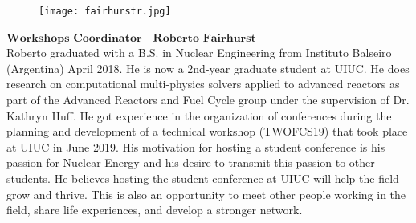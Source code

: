 \setlength\intextsep{0pt}
\begin{figure}
	\begin{center}
		\vspace{-\baselineskip}
		\texttt{[image: fairhurstr.jpg]}
	\end{center}
\end{figure}
$\textbf{Workshops Coordinator - Roberto Fairhurst}$\\
Roberto graduated with a B.S. in Nuclear Engineering from Instituto Balseiro (Argentina) April 2018. He is now a 2nd-year graduate student at UIUC. He does research on computational multi-physics solvers applied to advanced reactors as part of the Advanced Reactors and Fuel Cycle group under the supervision of Dr. Kathryn Huff. He got experience in the organization of conferences during the planning and development of a technical workshop (TWOFCS19) that took place at UIUC in June 2019. His motivation for hosting a student conference is his passion for Nuclear Energy and his desire to transmit this passion to other students. He believes hosting the student conference at UIUC will help the field grow and thrive. This is also an opportunity to meet other people working in the field, share life experiences, and develop a stronger network.


